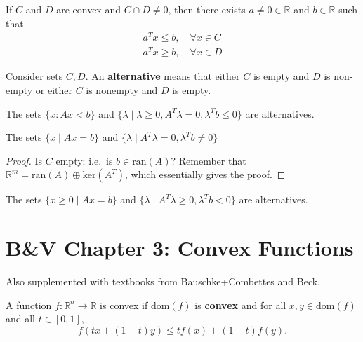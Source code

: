 \documentclass[english, 11pt]{article}
\begin{document}
\begin{thrm}
If $C$ and $D$ are convex and $C \cap D \neq 0$, then there exists $a \neq 0 \in \mathbb{R}$ and $b \in \mathbb{R}$ such that 
\begin{align*}
a^T x \le b, \quad \forall x \in C \\
a^T x \ge b, \quad \forall x \in D
\end{align*}
\end{thrm}

\begin{defn}
Consider sets $C,D$. An {\bf alternative} means that either $C$ is empty and $D$ is non-empty or either $C$ is nonempty and $D$ is empty.
\end{defn}

\begin{thrm}
The sets $\{x : Ax < b \}$ and $\{ \lambda \mid \lambda \ge 0, A^T \lambda =0, \lambda^T b \le 0 \}$ are alternatives.
\end{thrm}

\begin{thrm}
The sets $\{x \mid Ax=b \}$ and $\{ \lambda \mid A^T \lambda =0, \lambda^T b \neq 0 \}$
\end{thrm}

\begin{proof}
Is $C$ empty; i.e.\ is $b \in \text{ran}(A)$? Remember that $\mathbb{R}^m = \text{ran}(A) \oplus \text{ker}(A^T)$, which essentially gives the proof.
\end{proof}

\begin{thrm}
The sets $\{x \ge 0 \mid Ax=b \}$ and $\{ \lambda \mid A^T \lambda \ge 0, \lambda^T b < 0 \}$ are alternatives.
\end{thrm}


\section{B\&V Chapter 3: Convex Functions}
Also supplemented with textbooks from Bauschke+Combettes and Beck.

\begin{defn}[Convex]
A function $f : \mathbb{R}^n \to \mathbb{R}$ is convex if $\text{dom}(f)$ is {\bf convex} and for all $x,y \in \text{dom}(f)$ and all $t \in [0,1]$,
\[
f(tx + (1-t) y) \le t f(x) + (1-t) f(y).
\]
\end{defn}
  
\end{document}
